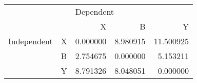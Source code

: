 \begin{tabular}{llrrr}
\toprule
            &   & \multicolumn{3}{l}{Dependent} \\
            &   &         X &         B &          Y \\
\midrule
Independent & X &  0.000000 &  8.980915 &  11.500925 \\
            & B &  2.754675 &  0.000000 &   5.153211 \\
            & Y &  8.791326 &  8.048051 &   0.000000 \\
\bottomrule
\end{tabular}
